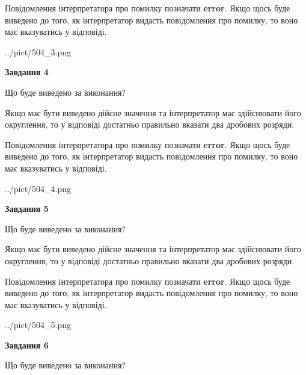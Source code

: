 \documentclass[12pt, ukrainian]{article}
\begin{document}
{\begin {Large}
Повідомлення інтерпретатора про помилку позначати \textbf{error}.
Якщо щось буде виведено до того, як інтерпретатор видасть повідомлення про помилку, 
то воно має вказуватись у відповіді. \par

\begin{center}
	{../pict/504_3.png}
\end{center}
\newpage

{\begin {center}\textbf{Завдання 4}\end {center}}\par
Що буде виведено за виконання? \par

Якщо має бути виведено дійсне значення та інтерпретатор має здійснювати його округлення, 
то у відповіді достатньо правильно вказати два дробових розряди.

Повідомлення інтерпретатора про помилку позначати \textbf{error}.
Якщо щось буде виведено до того, як інтерпретатор видасть повідомлення про помилку, 
то воно має вказуватись у відповіді. \par

\begin{center}
	{../pict/504_4.png}
\end{center}
\newpage

{\begin {center}\textbf{Завдання 5}\end {center}}\par
Що буде виведено за виконання? \par

Якщо має бути виведено дійсне значення та інтерпретатор має здійснювати його округлення, 
то у відповіді достатньо правильно вказати два дробових розряди.

Повідомлення інтерпретатора про помилку позначати \textbf{error}.
Якщо щось буде виведено до того, як інтерпретатор видасть повідомлення про помилку, 
то воно має вказуватись у відповіді. \par

\begin{center}
	{../pict/504_5.png}
\end{center}
\newpage

{\begin {center}\textbf{Завдання 6}\end {center}}\par
Що буде виведено за виконання? \par


\end{Large}}
\end{document}
